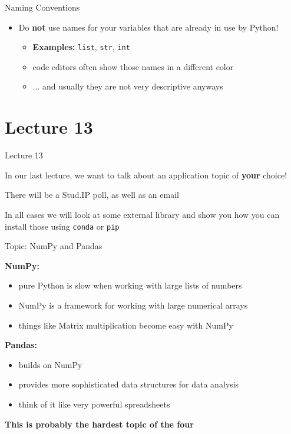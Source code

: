 \begin{frame}{Naming Conventions}

    \begin{itemize}
        \item Do \textbf{not} use names for your variables that are already in use by Python!
        \begin{itemize}
            \item \textbf{Examples:} \texttt{list}, \texttt{str}, \texttt{int}
            \item code editors often show those names in a different color
            \item ... and usually they are not very descriptive anyways
        \end{itemize}
    \end{itemize}

\end{frame}

\section{Lecture 13}

\begin{frame}{Lecture 13}

    In our last lecture, we want to talk about an application topic of \textbf{your} choice!

    \vspace{1em}

    There will be a Stud.IP poll, as well as an email

    \vspace{1em}

    In all cases we will look at some external library and show you how you can install those using \texttt{conda} or \texttt{pip}

\end{frame}

\begin{frame}{Topic: NumPy and Pandas}

    \textbf{NumPy:}

    \begin{itemize}
        \item pure Python is slow when working with large lists of numbers
        \item NumPy is a framework for working with large numerical arrays
        \item things like Matrix multiplication become easy with NumPy
    \end{itemize}

    \textbf{Pandas:}

    \begin{itemize}
        \item builds on NumPy
        \item provides more sophisticated data structures for data analysis
        \item think of it like very powerful spreadsheets
    \end{itemize}

    \textbf{This is probably the hardest topic of the four}

\end{frame}

